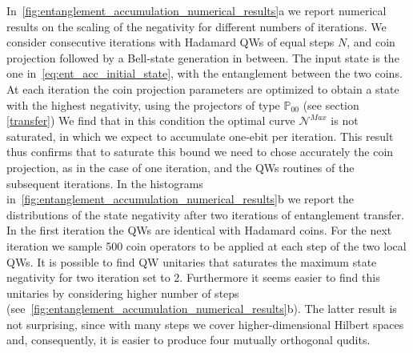 \documentclass[
	aps, pra,
	superscriptaddress, twocolumn,
	floatfix,
	10pt
]{revtex4-1}
\newcommand{\parTitle}[1]{\noindent{\color{Mahogany}(\emph{#1})}}
\newcommand{\PP}{\mathbb{P}}
\begin{document}
\parTitle{Numerical results \label{transfer}}
In~\cref{fig:entanglement_accumulation_numerical_results}a we report numerical results on the scaling of the negativity for different numbers of iterations.
We consider consecutive iterations with Hadamard QWs of equal steps $N$, and coin projection followed by a Bell-state generation in between. The input state is the one in~\cref{eq:ent_acc_initial_state}, with the entanglement between the two coins.
At each iteration the coin projection parameters are optimized to obtain a state with the highest negativity, using the projectors of type $\PP_{00}$ (see section \ref{transfer})
We find that in this condition the optimal curve $\mathcal{N}^{Max}$ is not saturated, in which we expect to accumulate one-ebit per iteration. This result thus confirms that to saturate this bound we need to chose accurately the coin projection, as in the case of one iteration, and the QWs routines of the subsequent iterations.
In the histograms in~\cref{fig:entanglement_accumulation_numerical_results}b we report the distributions of the state negativity after two iterations of entanglement transfer. In the first iteration the QWs are identical with Hadamard coins. For the next iteration we sample 500 coin operators to be applied at each step of the two local QWs.
It is possible to find QW unitaries that saturates the maximum state negativity for two iteration set to 2. Furthermore it seems easier to find this unitaries by considering higher number of steps (see~\cref{fig:entanglement_accumulation_numerical_results}b). The latter result is not surprising, since with many steps we cover higher-dimensional Hilbert spaces and, consequently, it is easier to produce four mutually orthogonal qudits.

\parTitle{Conclusions?}
\end{document}
